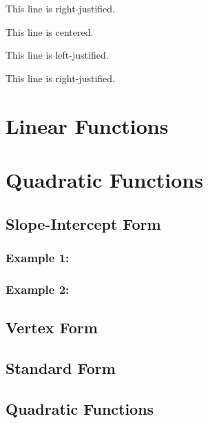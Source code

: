 \documentclass[11pt]{article}
\begin{document}
\begin{flushright}This line is right-justified.\end{flushright}

\tiny
This line is centered.

This line is left-justified.

This line is right-justified.

\section{Linear Functions}
\section{Quadratic Functions}
    \subsection{Slope-Intercept Form}
        \subsubsection{Example 1:}
        \subsubsection{Example 2:}
    \subsection{Vertex Form}
    \subsection{Standard Form}
    \subsection{Quadratic Functions}
\end{document}
